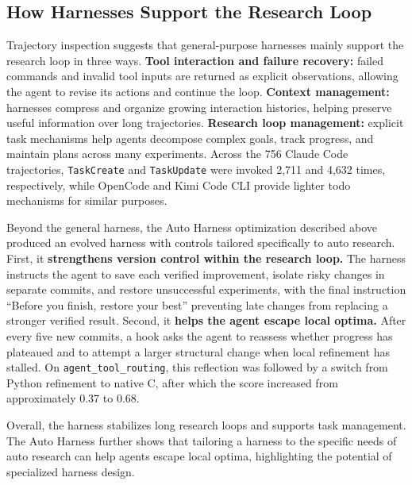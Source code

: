 \subsection{How Harnesses Support the Research Loop}

Trajectory inspection suggests that general-purpose harnesses mainly support the research loop in three ways. \textbf{Tool interaction and failure recovery:} failed commands and invalid tool inputs are returned as explicit observations, allowing the agent to revise its actions and continue the loop. 
\textbf{Context management:} harnesses compress and organize growing interaction histories, helping preserve useful information over long trajectories. \textbf{Research loop management:} explicit task mechanisms help agents decompose complex goals, track progress, and maintain plans across many experiments. Across the 756 Claude Code trajectories, \texttt{TaskCreate} and \texttt{TaskUpdate} were invoked 2,711 and 4,632 times, respectively, while OpenCode and Kimi Code CLI provide lighter todo mechanisms for similar purposes.


Beyond the general harness, the Auto Harness optimization described above produced an evolved harness with controls tailored specifically to auto research.
First, it \textbf{strengthens version control within the research loop.} The harness instructs the agent to save each verified improvement, isolate risky changes in separate commits, and restore unsuccessful experiments, with the final instruction ``Before you finish, restore your best'' preventing late changes from replacing a stronger verified result. Second, it \textbf{helps the agent escape local optima.} After every five new commits, a hook asks the agent to reassess whether progress has plateaued and to attempt a larger structural change when local refinement has stalled.
On \texttt{agent\_tool\_routing}, this reflection was followed by a switch from Python refinement to native C, after which the score increased from approximately $0.37$ to $0.68$.

Overall, the harness stabilizes long research loops and supports task management. 
The Auto Harness further shows that tailoring a harness to the specific needs of auto research can help agents escape local optima, highlighting the potential of specialized harness design.
